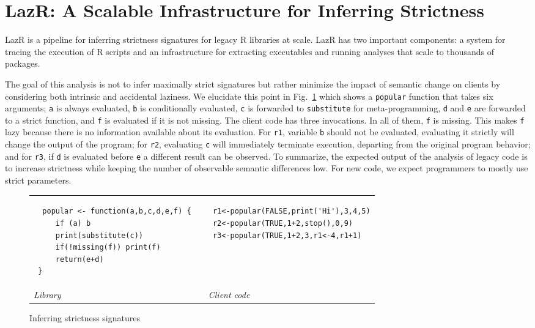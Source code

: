 \documentclass[review,screen,acmsmall]{acmart}
\renewcommand{\c}[1]{\lstinline |#1|\xspace}
\newcommand{\lazr}{{\sf LazR}\xspace}
\begin{document}
\section{LazR: A Scalable Infrastructure for Inferring Strictness}\label{sec:lazr}

\lazr is a pipeline for inferring strictness signatures for legacy R libraries
at scale. \lazr has two important components: a system for tracing the execution
of R scripts and an infrastructure for extracting executables and running
analyses that scale to thousands of packages.


The goal of this analysis is not to infer maximally strict signatures but rather
minimize the impact of semantic change on clients by considering both intrinsic
and accidental laziness. We elucidate this point in Fig.~\ref{iss} which
shows a \c{popular} function that takes six arguments; \c{a} is always
evaluated, \c{b} is conditionally evaluated, \c{c} is forwarded to
\c{substitute} for meta-programming, \c{d} and \c{e} are forwarded to a
strict function, and \c{f} is evaluated if it is not missing. The client code
has three invocations. In all of them, \c{f} is missing. This makes \c{f}
lazy because there is no information available about its evaluation. For \c{r1},
variable \c b should not be evaluated, evaluating it strictly will change the
output of the program; for \c{r2}, evaluating \c{c} will immediately
terminate execution, departing from the original program behavior; and for
\c{r3}, if \c{d} is evaluated before \c{e} a different result can be observed.
To summarize, the expected output of the analysis of legacy code is to increase
strictness while keeping the number of observable semantic differences low. For
new code, we expect programmers to mostly use strict parameters.

\begin{figure}[!h]
  \begin{tabular}{lll}
    \begin{minipage}{6cm}
\begin{lstlisting}
  popular <- function(a,b,c,d,e,f) {
     if (a) b
     print(substitute(c))
     if(!missing(f)) print(f)
     return(e+d)
 }
\end{lstlisting}

    \end{minipage}
    &&
       \begin{minipage}{6cm}
\begin{lstlisting}
 r1<-popular(FALSE,print('Hi'),3,4,5)
 r2<-popular(TRUE,1+2,stop(),0,9)
 r3<-popular(TRUE,1+2,3,r1<-4,r1+1)
\end{lstlisting}
       \end{minipage}\\
    {\it Library}&&{\it Client code}
  \end{tabular}%
  \caption{Inferring strictness signatures}\label{iss} %
\end{figure}
\end{document}
